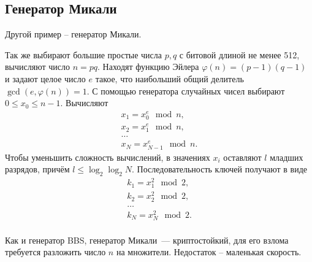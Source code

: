 \subsection{Генератор Микали}

Другой пример -- генератор Микали.

Так же выбирают большие простые числа $p,q$ с битовой длиной не менее 512, вычисляют число $n = pq$. Находят функцию Эйлера $\varphi(n) = (p-1) (q-1)$ и задают целое число $e$ такое, что наибольший общий делитель $\gcd(e, \varphi(n)) = 1$. С помощью генератора случайных чисел выбирают $0 \leq x_{0} \leq n-1$. Вычисляют
\[ \begin{array}{l}
    x_1 = x_0^e \mod n, \\
    x_2 = x_1^e \mod n, \\
    \dots \\
    x_N = x_{N-1}^e \mod n.
\end{array} \]
Чтобы уменьшить сложность вычислений, в значениях $x_i$ оставляют $l$ младших разрядов, причём $l \leq \log_2 \log_2 N$. Последовательность ключей получают в виде
\[ \begin{array}{l}
    k_1 = x_1^2 \mod 2, \\
    k_2 = x_2^2 \mod 2, \\
    \dots \\
    k_N = x_N^2 \mod 2. \\
\end{array} \]

Как и генератор BBS, генератор Микали~--- криптостойкий, для его взлома требуется разложить число $n$ на множители. Недостаток -- маленькая скорость.
